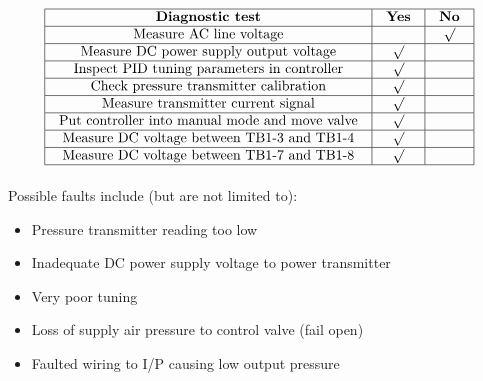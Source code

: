 






$$\vbox{\offinterlineskip
\halign{\strut
\vrule \quad\hfil # \ \hfil & 
\vrule \quad\hfil # \ \hfil & 
\vrule \quad\hfil # \ \hfil \vrule \cr
\noalign{\hrule}
%
{\bf Diagnostic test} & {\bf Yes} & {\bf No} \cr
%
\noalign{\hrule}
%
Measure AC line voltage &  & $\surd$ \cr
%
\noalign{\hrule}
%
Measure DC power supply output voltage & $\surd$ &  \cr
%
\noalign{\hrule}
%
Inspect PID tuning parameters in controller & $\surd$ &  \cr
%
\noalign{\hrule}
%
Check pressure transmitter calibration & $\surd$ &  \cr
%
\noalign{\hrule}
%
Measure transmitter current signal & $\surd$ &  \cr
%
\noalign{\hrule}
%
Put controller into manual mode and move valve & $\surd$ &  \cr
%
\noalign{\hrule}
%
Measure DC voltage between TB1-3 and TB1-4 & $\surd$ &  \cr
%
\noalign{\hrule}
%
Measure DC voltage between TB1-7 and TB1-8 & $\surd$ &  \cr
%
\noalign{\hrule}
} %
}$$ %







Possible faults include (but are not limited to):

\begin{itemize}
\item{} Pressure transmitter reading too low
\item{} Inadequate DC power supply voltage to power transmitter
\item{} Very poor tuning
\item{} Loss of supply air pressure to control valve (fail open)
\item{} Faulted wiring to I/P causing low output pressure
\end{itemize}




